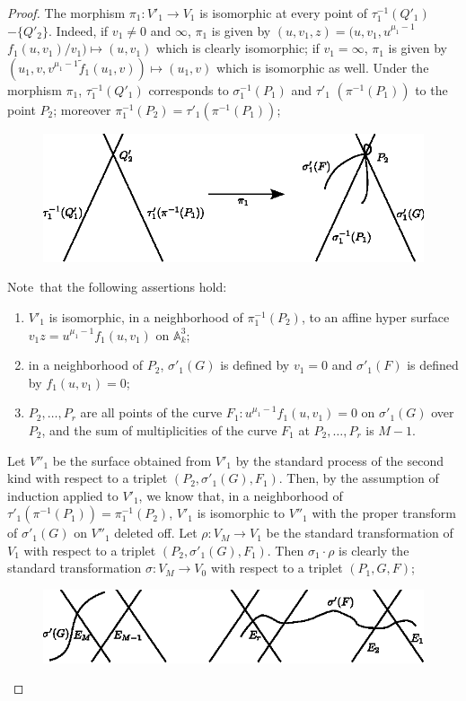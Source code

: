 \begin{proof}
The morphism $\pi_{1}:V'_{1}\to V_{1}$ is isomorphic at every point of
$\tau^{-1}_{1}(Q'_{1})$ $-\{Q'_{2}\}$. Indeed, if $v_{1}\neq 0$ and
$\infty$, $\pi_{1}$ is given by
$(u,v_{1},z)=(u,v_{1},u^{\mu_{1}-1}$ $f_{1}(u,v_{1})/v_{1})\mapsto
(u,v_{1})$ which is clearly isomorphic; if $v_{1}=\infty$, $\pi_{1}$
is given by $(u_{1},v,v^{\mu_{1}-1}\widetilde{f}_{1}(u_{1},v))\mapsto
(u_{1},v)$ which is isomorphic as well. Under the morphism $\pi_{1}$,
$\tau^{-1}_{1}(Q'_{1})$ corresponds to $\sigma^{-1}_{1}(P_{1})$ and
$\tau'_{1}$ \break $(\pi^{-1}(P_{1}))$ to the point $P_{2}$; moreover
$\pi^{-1}_{1}(P_{2})=\tau'_{1}(\pi^{-1}(P_{1}))$; 
\begin{figure}[H]
\centering
\includegraphics{figures/chap2-fig11.eps}
\end{figure}
Note\pageoriginale\ that the following assertions hold:
\begin{enumerate}
\renewcommand{\labelenumi}{(\theenumi)}
\item $V'_{1}$ is isomorphic, in a neighborhood of
  $\pi^{-1}_{1}(P_{2})$, to an affine hyper surface
  $v_{1}z=u^{\mu_{1}-1}f_{1}(u,v_{1})$ on $\mathbb{A}^{3}_{k}$; 

\item in a neighborhood of $P_{2}$, $\sigma'_{1}(G)$ is defined by
  $v_{1}=0$ and $\sigma'_{1}(F)$ is defined by $f_{1}(u,v_{1})=0$;

\item $P_{2},\ldots,P_{r}$ are all points of the curve
  $F_{1}:u^{\mu_{1}-1}f_{1}(u,v_{1})=0$ on $\sigma'_{1}(G)$ over
  $P_{2}$, and the sum of multiplicities of the curve $F_{1}$ at
  $P_{2},\ldots,P_{r}$ is $M-1$.
\end{enumerate}

Let $V''_{1}$ be the surface obtained from $V'_{1}$ by the standard
process of the second kind with respect to a triplet
$(P_{2},\sigma'_{1}(G),F_{1})$. Then, by the assumption of induction
applied to $V'_{1}$, we know that, in a neighborhood of
$\tau'_{1}(\pi^{-1}(P_{1}))=\pi^{-1}_{1}(P_{2})$, $V'_{1}$ is
isomorphic to $V''_{1}$ with the proper transform of $\sigma'_{1}(G)$
on $V''_{1}$ deleted off. Let $\rho:V_{M}\to V_{1}$ be the standard
transformation of $V_{1}$ with respect to a triplet
$(P_{2},\sigma'_{1}(G),F_{1})$. Then $\sigma_{1}\cdot\rho$ is
clearly the standard transformation $\sigma:V_{M}\to V_{0}$ with
respect to a triplet $(P_{1},G,F)$; 
\begin{figure}[H]
\centering
\includegraphics[scale=1.2]{figures/chap2-fig12.eps}


\end{figure}
\end{proof}

